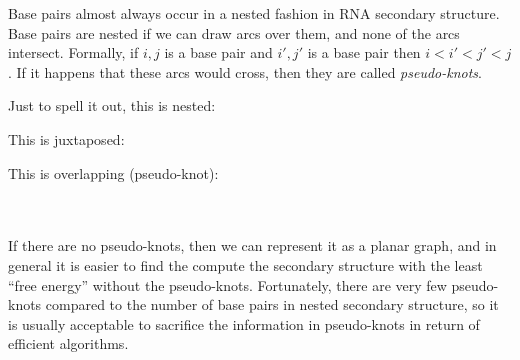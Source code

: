     Base pairs almost always occur in a nested fashion in RNA secondary 
    structure. Base pairs are nested if we can draw arcs over them, and none of 
    the arcs intersect. Formally, if $i,j$ is a base pair and $i',j'$ is a base 
    pair then $i<i'<j'<j$. If it happens that these arcs would cross, then they 
    are called \textit{pseudo-knots}.
    
    \begin{minipage}{\textwidth}
    Just to spell it out, this is nested:
    
    
    This is juxtaposed:
    
    
    This is overlapping (pseudo-knot):
    
    \end{minipage}
    \\
    \\
    If there are no pseudo-knots, then we can represent it as a planar graph, 
    and in general it is easier to find the compute the secondary structure 
    with the least ``free energy'' without the pseudo-knots. Fortunately, there 
    are very few pseudo-knots compared to the number of base pairs in nested 
    secondary structure, so it is usually acceptable to sacrifice the 
    information in pseudo-knots in return of efficient algorithms.
    

